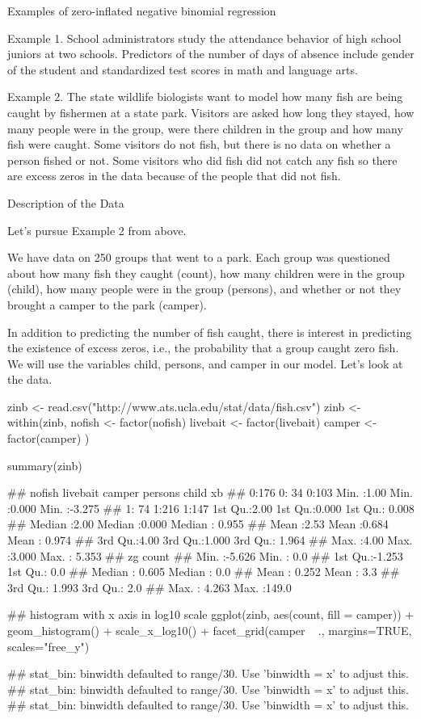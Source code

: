Examples of zero-inflated negative binomial regression

Example 1. School administrators study the attendance behavior of high school juniors at two schools. Predictors of the number of days of absence include gender of the student and standardized test scores in math and language arts.

Example 2. The state wildlife biologists want to model how many fish are being caught by fishermen at a state park. Visitors are asked how long they stayed, how many people were in the group, were there children in the group and how many fish were caught. Some visitors do not fish, but there is no data on whether a person fished or not. Some visitors who did fish did not catch any fish so there are excess zeros in the data because of the people that did not fish. 

Description of the Data

Let's pursue Example 2 from above.
 
We have data on 250 groups that went to a park. Each group was questioned about how many fish they caught (count), how many children were in the group (child), how many people were in the group (persons), and whether or not they brought a camper to the park (camper).

In addition to predicting the number of fish caught, there is interest in predicting the existence of excess zeros, i.e., the probability that a group caught zero fish. We will use the variables child, persons, and camper in our model. Let's look at the data.



zinb <- read.csv("http://www.ats.ucla.edu/stat/data/fish.csv")
zinb <- within(zinb, {
  nofish <- factor(nofish)
  livebait <- factor(livebait)
  camper <- factor(camper)
})

summary(zinb)
 
##  nofish  livebait camper     persons         child             xb        
##  0:176   0: 34    0:103   Min.   :1.00   Min.   :0.000   Min.   :-3.275  
##  1: 74   1:216    1:147   1st Qu.:2.00   1st Qu.:0.000   1st Qu.: 0.008  
##                           Median :2.00   Median :0.000   Median : 0.955  
##                           Mean   :2.53   Mean   :0.684   Mean   : 0.974  
##                           3rd Qu.:4.00   3rd Qu.:1.000   3rd Qu.: 1.964  
##                           Max.   :4.00   Max.   :3.000   Max.   : 5.353  
##        zg             count      
##  Min.   :-5.626   Min.   :  0.0  
##  1st Qu.:-1.253   1st Qu.:  0.0  
##  Median : 0.605   Median :  0.0  
##  Mean   : 0.252   Mean   :  3.3  
##  3rd Qu.: 1.993   3rd Qu.:  2.0  
##  Max.   : 4.263   Max.   :149.0
 
## histogram with x axis in log10 scale
ggplot(zinb, aes(count, fill = camper)) +
  geom_histogram() +
  scale_x_log10() +
  facet_grid(camper ~ ., margins=TRUE, scales="free_y")
 
## stat_bin: binwidth defaulted to range/30. Use 'binwidth = x' to adjust this.
## stat_bin: binwidth defaulted to range/30. Use 'binwidth = x' to adjust this.
## stat_bin: binwidth defaulted to range/30. Use 'binwidth = x' to adjust this.
 
